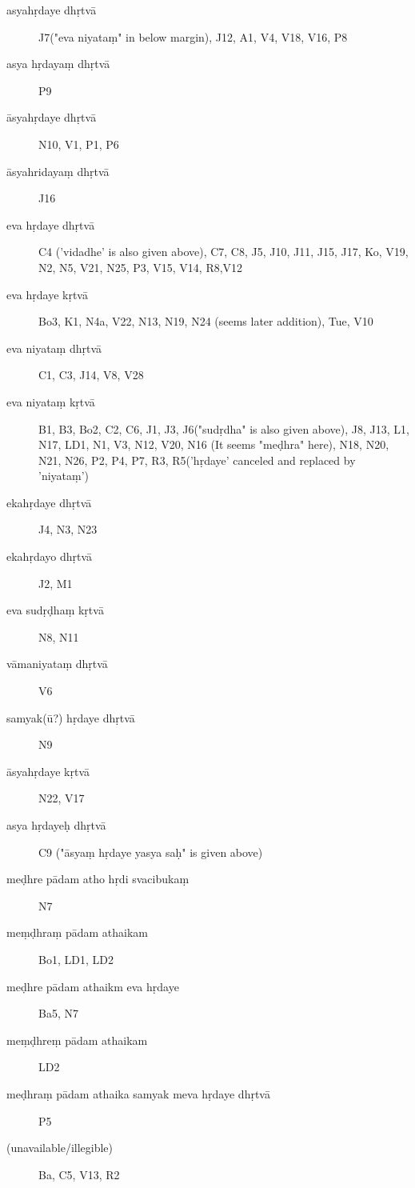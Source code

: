 \begin{ekdosis}
  \begin{marma}[hp01_035]
    \begin{description}
    \item[asyahṛdaye dhṛtvā]        J7("eva niyataṃ" in below margin), J12, A1, V4, V18, V16, P8
    \item[asya hṛdayaṃ dhṛtvā]   P9
    \item[āsyahṛdaye dhṛtvā]        N10, V1, P1, P6
    \item[āsyahridayaṃ dhṛtvā]        J16
    \item[eva hṛdaye dhṛtvā] C4 ('vidadhe' is also given above), C7, C8, J5, J10, J11, J15, J17, Ko, V19, N2, N5, V21, N25, P3, V15, V14, R8,V12
    \item[eva hṛdaye kṛtvā]        Bo3, K1, N4a, V22, N13, N19, N24 (seems later addition), Tue, V10
    \item[eva niyataṃ dhṛtvā]        C1, C3, J14, V8, V28
    \item[eva niyataṃ kṛtvā] B1, B3, Bo2, C2, C6, J1, J3, J6("sudṛdha" is also given above), J8, J13, L1, N17, LD1, N1, V3, N12, V20, N16 (It seems "meḍhra" here), N18, N20, N21, N26, P2, P4, P7, R3, R5('hṛdaye' canceled and replaced by 'niyataṃ')
    \item[ekahṛdaye dhṛtvā]        J4, N3, N23
    \item[ekahṛdayo dhṛtvā]        J2, M1
    \item[eva sudṛḍhaṃ kṛtvā]        N8, N11
    \item[vāmaniyataṃ dhṛtvā]        V6
    \item[samyak(ū?) hṛdaye dhṛtvā]        N9    
    \item[āsyahṛdaye kṛtvā]        N22, V17
    \item[asya hṛdayeḥ dhṛtvā]        C9 ("āsyaṃ hṛdaye yasya saḥ" is given above)
    \item[meḍhre pādam atho hṛdi svacibukaṃ]        N7
    \item[meṃḍhraṃ pādam athaikam]                Bo1, LD1, LD2
    \item[meḍhre pādam athaikm eva hṛdaye]        Ba5, N7
    \item[meṃḍhreṃ pādam athaikam]                LD2
    \item[meḍhraṃ pādam athaika samyak meva hṛdaye dhṛtvā]               P5
    \item[(unavailable/illegible)]        Ba, C5, V13, R2
    \end{description}
  \end{marma}


\end{ekdosis}
